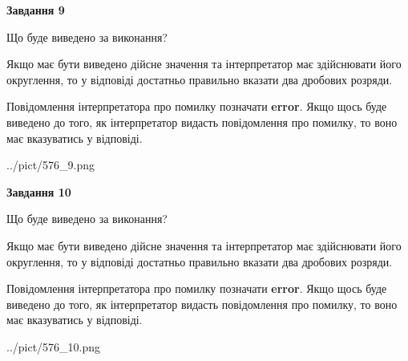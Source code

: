 \documentclass[12pt, ukrainian]{article}
\begin{document}
{\begin {Large}
{\begin {center}\textbf{Завдання 9}\end {center}}\par
Що буде виведено за виконання? \par

Якщо має бути виведено дійсне значення та інтерпретатор має здійснювати його округлення, 
то у відповіді достатньо правильно вказати два дробових розряди.

Повідомлення інтерпретатора про помилку позначати \textbf{error}.
Якщо щось буде виведено до того, як інтерпретатор видасть повідомлення про помилку, 
то воно має вказуватись у відповіді. \par

\begin{center}
	{../pict/576_9.png}
\end{center}
\newpage

{\begin {center}\textbf{Завдання 10}\end {center}}\par
Що буде виведено за виконання? \par

Якщо має бути виведено дійсне значення та інтерпретатор має здійснювати його округлення, 
то у відповіді достатньо правильно вказати два дробових розряди.

Повідомлення інтерпретатора про помилку позначати \textbf{error}.
Якщо щось буде виведено до того, як інтерпретатор видасть повідомлення про помилку, 
то воно має вказуватись у відповіді. \par

\begin{center}
	{../pict/576_10.png}
\end{center}
\newpage

\end {Large}}
\end{document}

